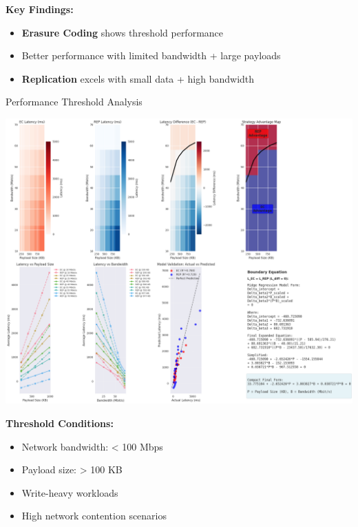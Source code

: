 \documentclass[a0,landscape]{config/poster/a0poster}
\newcommand{\postersection}[1]{%
  \begin{tcolorbox}[
      colback=ITBblue,
      colframe=ITBblue,
      fonttitle=\bfseries,
      coltext=white,
      sharp corners,
      boxrule=0pt,
      top=6pt,
      bottom=6pt,
      halign=center
    ]
    \Large #1
  \end{tcolorbox}%
}
\begin{document}
\begin{multicols}{4}
	\textbf{Key Findings:}
	\begin{itemize}
		\item \textcolor{ECcolor}{\textbf{Erasure Coding}} shows threshold performance
		\item Better performance with limited bandwidth + large payloads
		\item \textcolor{REPcolor}{\textbf{Replication}} excels with small data + high bandwidth
	\end{itemize}

	\columnbreak


	\postersection{Performance Threshold Analysis}
	
	\begin{center}
		\includegraphics[width=0.9\linewidth]{write_bigload_avgnet_boundary.png}
	\end{center}

	\textbf{Threshold Conditions:}
	\begin{itemize}
		\item Network bandwidth: < 100 Mbps
		\item Payload size: > 100 KB
		\item Write-heavy workloads
		\item High network contention scenarios
	\end{itemize}


\end{multicols}
\end{document}
